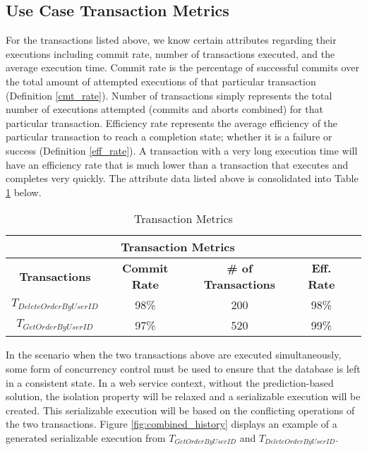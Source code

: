 \documentclass[conference]{IEEEtran}
\begin{document}
\subsection{Use Case Transaction Metrics}

For the transactions listed above, we know certain attributes regarding their executions including commit rate, number of transactions executed, and the average execution time. Commit rate is the percentage of successful commits over the total amount of attempted executions of that particular transaction (Definition \ref{cmt_rate}). Number of transactions simply represents the total number of executions attempted (commits and aborts combined) for that particular transaction. Efficiency rate represents the average efficiency of the particular transaction to reach a completion state; whether it is a failure or success (Definition \ref{eff_rate}). A transaction with a very long execution time will have an efficiency rate that is much lower than a transaction that executes and completes very quickly. The attribute data listed above is consolidated into Table \ref{tbl:trans_metrics} below. 
\\
\begin{table}[h]
\captionsetup{justification=centering}
\centering
\begin{tabular}{|c|c|c|c|c|}
\hline
\multicolumn{4}{|c|}{\cellcolor[HTML]{EFEFEF}\textbf{Transaction Metrics}}                                                   \\ \hline
\textbf{Transactions} & \textbf{Commit Rate} & \textbf{\# of Transactions} & {\color[HTML]{000000} \textbf{Eff. Rate}} \\ \hline
$T_{DeleteOrderByUserID}$         & 98\%                  & 200                         & 98\%                                          \\ \hline
$T_{GetOrderByUserID}$          & 97\%                     & 520                           & 99\%                                              \\ \hline
\end{tabular}

\caption{Transaction Metrics} %
\label{tbl:trans_metrics} %

\end{table}

In the scenario when the two transactions above are executed simultaneously, some form of concurrency control must be used to ensure that the database is left in a consistent state. In a web service context, without the prediction-based solution, the isolation property will be relaxed and a serializable execution will be created. This serializable execution will be based on the conflicting operations of the two transactions. Figure \ref{fig:combined_history} displays an example of a generated serializable execution from $T_{GetOrderByUserID}$ and $T_{DeleteOrderByUserID}$.
\end{document}
